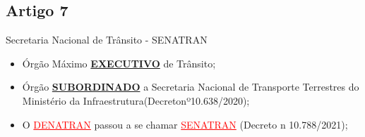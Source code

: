 \documentclass{beamer}
\begin{document}
\subsection{Artigo 7}
\begin{frame}{Secretaria Nacional de Trânsito - SENATRAN}
    \begin{itemize}
        \item Órgão Máximo \textbf{\underline{EXECUTIVO}} de Trânsito;
        \item \justifying Órgão \textbf{\underline{SUBORDINADO}} a Secretaria Nacional de Transporte Terrestres do Ministério da Infraestrutura(Decretonº10.638/2020);
        \item \justifying O \textcolor{red}{\underline{DENATRAN}} passou a se chamar \textcolor{red}{\underline{SENATRAN}} (Decreto n 10.788/2021);
    \end{itemize}
\end{frame}
\end{document}
